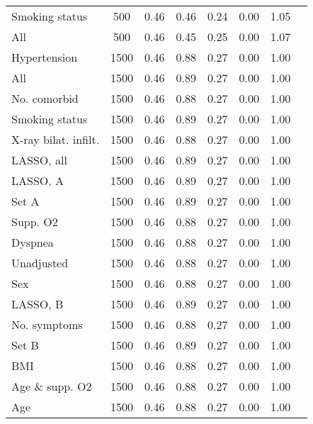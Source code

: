 \documentclass{article}
\begin{document}
{\begin{longtable}{lccccccc}
Smoking status & 500 & 0.46 & 0.46 & 0.24 & 0.00 & 1.05\\
All & 500 & 0.46 & 0.45 & 0.25 & 0.00 & 1.07\\ \midrule
Hypertension & 1500 & 0.46 & 0.88 & 0.27 & 0.00 & 1.00\\
All & 1500 & 0.46 & 0.89 & 0.27 & 0.00 & 1.00\\
No. comorbid & 1500 & 0.46 & 0.88 & 0.27 & 0.00 & 1.00\\
Smoking status & 1500 & 0.46 & 0.89 & 0.27 & 0.00 & 1.00\\
X-ray bilat. infilt. & 1500 & 0.46 & 0.88 & 0.27 & 0.00 & 1.00\\
LASSO, all & 1500 & 0.46 & 0.89 & 0.27 & 0.00 & 1.00\\
LASSO, A & 1500 & 0.46 & 0.89 & 0.27 & 0.00 & 1.00\\
Set A & 1500 & 0.46 & 0.89 & 0.27 & 0.00 & 1.00\\
Supp. O2 & 1500 & 0.46 & 0.88 & 0.27 & 0.00 & 1.00\\
Dyspnea & 1500 & 0.46 & 0.88 & 0.27 & 0.00 & 1.00\\
Unadjusted & 1500 & 0.46 & 0.88 & 0.27 & 0.00 & 1.00\\
Sex & 1500 & 0.46 & 0.88 & 0.27 & 0.00 & 1.00\\
LASSO, B & 1500 & 0.46 & 0.89 & 0.27 & 0.00 & 1.00\\
No. symptoms & 1500 & 0.46 & 0.88 & 0.27 & 0.00 & 1.00\\
Set B & 1500 & 0.46 & 0.89 & 0.27 & 0.00 & 1.00\\
BMI & 1500 & 0.46 & 0.88 & 0.27 & 0.00 & 1.00\\
Age \& supp. O2 & 1500 & 0.46 & 0.88 & 0.27 & 0.00 & 1.00\\
Age & 1500 & 0.46 & 0.88 & 0.27 & 0.00 & 1.00\\
\bottomrule
\hline
\end{longtable}
}
\end{document}
